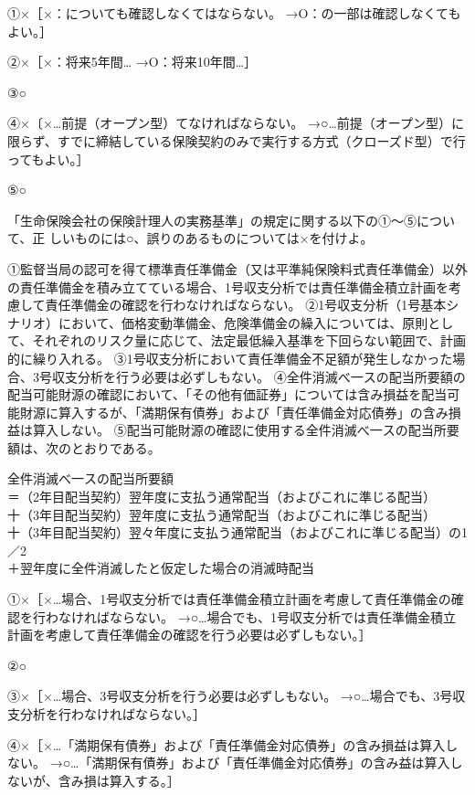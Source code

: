 \documentclass[report,gutter=10mm,fore-edge=10mm,uplatex,dvipdfmx]{jlreq}
\begin{document}
\answer{}
①×［×：についても確認しなくてはならない。
→O：の一部は確認しなくてもよい。］

②×［×：将来5年間…
→O：将来10年間…］

③○

④×〔×…前提（オープン型）てなければならない。
→○…前提（オープン型）に限らず、すでに締結している保険契約のみで実行する方式（クローズド型）で行ってもよい。］

⑤○

「生命保険会社の保険計理人の実務基準」の規定に関する以下の①〜⑤について、正
しいものには○、誤りのあるものについては×を付けよ。

①監督当局の認可を得て標準責任準備金（又は平準純保険料式責任準備金）以外の責任準備金を積み立てている場合、1号収支分析では責任準備金積立計画を考慮して責任準備金の確認を行わなければならない。
②1号収支分析（1号基本シナリオ）において、価格変動準備金、危険準備金の繰入については、原則として、それぞれのリスク量に応じて、法定最低繰入基準を下回らない範囲で、計画的に繰り入れる。
③1号収支分析において責任準備金不足額が発生しなかった場合、3号収支分析を行う必要は必ずしもない。
④全件消滅べ一スの配当所要額の配当可能財源の確認において、「その他有価証券」については含み損益を配当可能財源に算入するが、「満期保有債券」および「責任準備金対応債券」の含み損益は算入しない。
⑤配当可能財源の確認に使用する全件消滅べ一スの配当所要額は、次のとおりである。

全件消滅べ一スの配当所要額\\
＝（2年目配当契約）翌年度に支払う通常配当（およびこれに準じる配当）\\
十（3年目配当契約）翌年度に支払う通常配当（およびこれに準じる配当）\\
十（3年目配当契約）翌々年度に支払う通常配当（およびこれに準じる配当）の1／2\\
＋翌年度に全件消滅したと仮定した場合の消滅時配当

\answer{}
①×［×…場合、1号収支分析では責任準備金積立計画を考慮して責任準備金の確認を行わなければならない。
→○…場合でも、1号収支分析では責任準備金積立計画を考慮して責任準備金の確認を行う必要は必ずしもない。］

②○

③×［×…場合、3号収支分析を行う必要は必ずしもない。
→○…場合でも、3号収支分析を行わなければならない。］

④×［×…「満期保有債券」および「責任準備金対応債券」の含み損益は算入しない。
→○…「満期保有債券」および「責任準備金対応債券」の含み益は算入しないが、含み損は算入する。］
\end{document}
